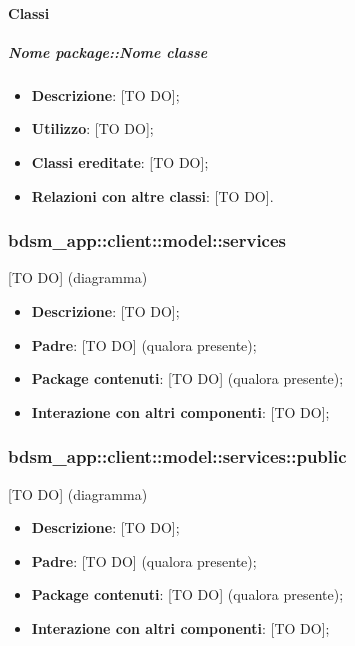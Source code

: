 		\paragraph{Classi} %
			\subparagraph{Nome package::Nome classe} %
			\label{subp:subparagraph_name}
				\begin{itemize}
					\item \textbf{Descrizione}: [TO DO];
					\item \textbf{Utilizzo}: [TO DO];
					\item \textbf{Classi ereditate}: [TO DO];
					\item \textbf{Relazioni con altre classi}: [TO DO].
				\end{itemize}	



	\subsubsection{bdsm\_app::client::model::services} %
	\label{ssub:bdsm_app_client_model_services}
	[TO DO] (diagramma) \newline \newline

	\begin{itemize}
		\item \textbf{Descrizione}: [TO DO];
		\item \textbf{Padre}: [TO DO] (qualora presente);
		\item \textbf{Package contenuti}: [TO DO] (qualora presente);
		\item \textbf{Interazione con altri componenti}: [TO DO];
	\end{itemize}

	\subsubsection{bdsm\_app::client::model::services::public} %
	\label{ssub:bdsm_app_client_model_services_public}
	[TO DO] (diagramma) \newline \newline

	\begin{itemize}
		\item \textbf{Descrizione}: [TO DO];
		\item \textbf{Padre}: [TO DO] (qualora presente);
		\item \textbf{Package contenuti}: [TO DO] (qualora presente);
		\item \textbf{Interazione con altri componenti}: [TO DO];
	\end{itemize}

